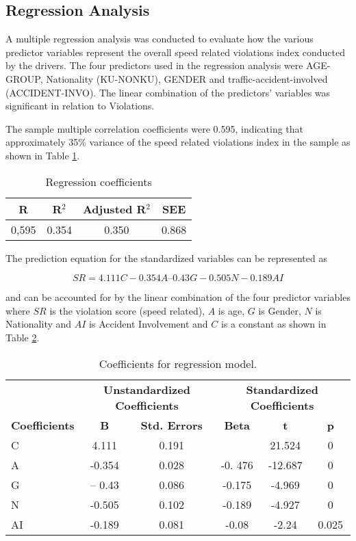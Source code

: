 \documentclass[preprint,12pt,a4paper,authoryear]{elsarticle}
\begin{document}
\subsection{Regression Analysis}

A multiple regression analysis was conducted to evaluate how the various predictor variables represent the overall speed related violations index conducted by the drivers. The four predictors used in the regression analysis were AGE-GROUP, Nationality (KU-NONKU), GENDER and traffic-accident-involved (ACCIDENT-INVO). The linear combination of the predictors' variables was significant in relation to Violations.

The sample multiple correlation coefficients were 0.595, indicating that approximately 35\% variance of the speed related violations index in the sample as shown in Table  \ref{tab:regression}.

\begin{table}[H]
\centering
\caption{Regression coefficients}
\label{tab:regression}
\begin{tabular}{@{}cccc@{}}
\toprule
\textbf{R} & \textbf{R$^{2}$} & \textbf{Adjusted  R$^{2}$} & \textbf{SEE} \\ \midrule
0,595 & 0.354 & 0.350 & 0.868 \\ \bottomrule
\end{tabular}
\end{table}

The prediction equation for the standardized variables can be represented as 

\begin{equation}
SR= 4.111C -0.354A – 0.43G -0.505N -0.189AI
\end{equation}

\noindent
and can be accounted for by the linear combination of the four predictor variables where $SR$ is the violation score (speed related),  $A$ is age, $G$ is Gender, $N$ is Nationality and $AI$ is Accident Involvement and $C$ is a constant as shown in Table \ref{tab:regression-coef}.

\begin{table}[H]
\centering
\caption{Coefficients for regression model.}
\label{tab:regression-coef}
\begin{tabular}{@{}lccccc@{}}
\toprule
\textbf{} & \multicolumn{2}{c}{\textbf{Unstandardized Coefficients}} & \multicolumn{3}{c}{\textbf{Standardized Coefficients}} \\ 
\textbf{Coefficients} & \textbf{B} & \textbf{Std. Errors} & \textbf{Beta} & \textbf{t} & \textbf{p} \\ \midrule
C & 4.111 & 0.191 &  & 21.524 & 0 \\
A & -0.354 & 0.028 & -0. 476 & -12.687 & 0 \\
G & – 0.43 & 0.086 & -0.175 & -4.969 & 0 \\
N & -0.505 & 0.102 & -0.189 & -4.927 & 0 \\
AI & -0.189 & 0.081 & -0.08 & -2.24 & 0.025 \\ \bottomrule
\end{tabular}
\end{table}
\end{document}
